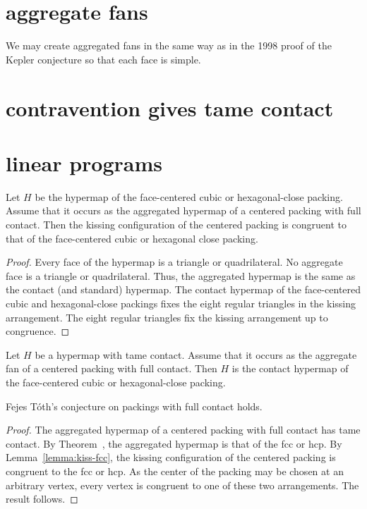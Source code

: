 \section{aggregate fans}

We may create aggregated fans in the same way as in the 1998 proof of the Kepler conjecture so that each face is simple.

\section{contravention gives tame contact}

\section{linear programs}

\begin{lemma}\label{lemma:kiss-fcc} Let $H$ be the hypermap of the face-centered cubic or hexagonal-close packing.   Assume that it occurs as the aggregated hypermap of a centered packing with full contact.  Then the kissing configuration of the centered packing is congruent to that of the face-centered cubic or hexagonal close packing.
\end{lemma}

\begin{proof} Every face of the hypermap is a triangle or quadrilateral.  No aggregate face is a triangle or quadrilateral.  Thus, the aggregated hypermap is the same as the contact (and standard) hypermap.  The contact hypermap of the face-centered cubic and hexagonal-close packings fixes the eight regular triangles in the kissing arrangement.  The eight regular triangles fix the kissing arrangement up to congruence.
\end{proof}

\begin{theorem}\label{lemma:fcc} Let $H$ be a hypermap with tame contact.  Assume that it occurs as the aggregate fan of a centered packing with full contact.  Then $H$ is the contact hypermap of the face-centered cubic or hexagonal-close packing.
\end{theorem}

\begin{theorem}  
Fejes T\'oth's conjecture on packings with full contact holds.
\end{theorem}

\begin{proof} The aggregated hypermap of a centered packing with full contact has tame contact.  By Theorem~\label{lemma:fcc}, the aggregated hypermap is that of the fcc or hcp.  By Lemma~\ref{lemma:kiss-fcc}, the kissing configuration of the centered packing is congruent to the fcc or hcp.  As the center of the packing may be chosen at an arbitrary vertex, every vertex is congruent to one of these two arrangements.  The result follows.
\end{proof}